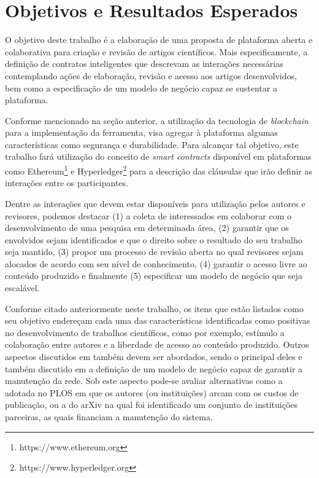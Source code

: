 \chapter{Objetivos e Resultados Esperados}
O objetivo deste trabalho é a elaboração de uma proposta de plataforma aberta e colaborativa para criação e revisão de artigos científicos. Mais especificamente, a definição de contratos inteligentes que descrevam as interações necessárias contemplando ações de elaboração, revisão e acesso aos artigos desenvolvidos, bem como a especificação de um modelo de negócio capaz se sustentar a plataforma.

Conforme mencionado na seção anterior, a utilização da tecnologia de \textit{blockchain} para a implementação da ferramenta, visa agregar à plataforma algumas características como segurança e durabilidade. Para alcançar tal objetivo, este trabalho fará utilização do conceito de \textit{smart contracts} disponível em plataformas como Ethereum\footnote{https://www.ethereum.org} e Hyperledger\footnote{https://www.hyperledger.org} para a descrição das cláusulas que irão definir as interações entre os participantes.

Dentre as interações que devem estar disponíveis para utilização pelos autores e revisores, podemos destacar (1) a coleta de interessados em colaborar com o desenvolvimento de uma pesquisa em determinada área, (2) garantir que os envolvidos sejam identificados e que o direito sobre o resultado do seu trabalho seja mantido, (3) propor um processo de revisão aberta no qual revisores sejam alocados de acordo com seu nível de conhecimento, (4) garantir o acesso livre ao conteúdo produzido e finalmente (5) especificar um modelo de negócio que seja escalável.

Conforme citado anteriormente neste trabalho, os itens que estão listados como seu objetivo endereçam cada uma das características identificadas como positivas no desenvolvimento de trabalhos científicos, como por exemplo, estímulo a colaboração entre autores e a liberdade de acesso ao conteúdo produzido. Outros aspectos discutidos em \cite{OpenAccessAnalysis2004} também devem ser abordados, sendo o principal deles e também discutido em \cite{InteractivePeerReview2010} a definição de um modelo de negócio capaz de garantir a manutenção da rede. Sob este aspecto pode-se avaliar alternativas como a adotada no PLOS em que os autores (ou instituições) arcam com os custos de publicação, ou a do arXiv na qual foi identificado um conjunto de instituições parceiras, as quais financiam a manutenção do sistema.

